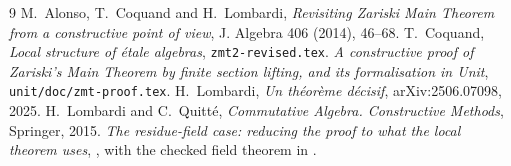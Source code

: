 \documentclass[11pt]{amsart}
\numberwithin{equation}{section}
\theoremstyle{definition}
\theoremstyle{remark}
\newcommand{\code}[1]{\texttt{#1}}
\begin{document}
\begin{thebibliography}{9}
 M.~Alonso, T.~Coquand and H.~Lombardi,
\emph{Revisiting Zariski Main Theorem from a constructive point of
view}, J. Algebra 406 (2014), 46--68.
 T.~Coquand, \emph{Local structure of \'etale algebras},
\code{zmt2-revised.tex}.
 \emph{A constructive proof of Zariski's Main Theorem by
finite section lifting, and its formalisation in Unit},
\code{unit/doc/zmt-proof.tex}.
 H.~Lombardi, \emph{Un th\'eor\`eme d\'ecisif},
arXiv:2506.07098, 2025.
 H.~Lombardi and C.~Quitt\'e, \emph{Commutative Algebra.
Constructive Methods}, Springer, 2015.
 \emph{The residue-field case: reducing the proof to
what the local theorem uses}, ,
with the checked field theorem in .
\end{thebibliography}
\end{document}

